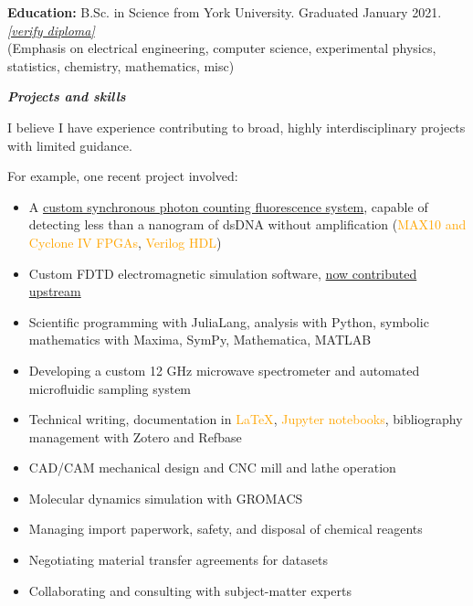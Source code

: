 \documentclass[fleqn,11pt]{article}
\newcommand{\ressection}[1]{\textbf{{\Large \textit{#1}}}\xrfill[0.1ex]{0.6pt}}
\newcommand{\sk}[1]{\textcolor{orange}{#1}}
\newcommand{\itemoptions}{\setlength{\itemindent}{-10pt} \setlength\itemsep{-1em}}
\begin{document}
\begin{tcolorbox}
	\textbf{Education:} B.Sc. in Science from York University. Graduated January 2021. \href{https://learner.mycreds.ca/#/sharelink/b664abe7-53a7-4d64-a0f1-bef16337edd0/57724eeb-34ab-4b79-b2a6-cd6bc311039e}{\textit{[verify diploma]}} \\
	{\small(Emphasis on electrical engineering, computer science, experimental physics, statistics, chemistry, mathematics, misc)}
\end{tcolorbox}
 
\pagebreak

\ressection{Projects and skills}

I believe I have experience contributing to broad, highly interdisciplinary projects with limited guidance.

For example, one recent project involved:
\begin{itemize}\itemoptions
	\item A \href{https://github.com/0xDBFB7/fluorescence_photon_counting/releases/download/v0.01/fluorescence.pdf}{custom synchronous photon counting fluorescence system}, capable of detecting less than a nanogram of dsDNA without amplification (\sk{MAX10 and Cyclone IV FPGAs}, \sk{Verilog HDL})
	\item Custom FDTD electromagnetic simulation software, \href{https://github.com/flaport/fdtd/pull/27}{now contributed upstream} 
	\item Scientific programming with JuliaLang, analysis with Python, symbolic mathematics with Maxima, SymPy, Mathematica, MATLAB
	\item Developing a custom 12 GHz microwave spectrometer and automated microfluidic sampling system
	\item Technical writing, documentation in \sk{LaTeX}, \sk{Jupyter notebooks}, bibliography management with Zotero and Refbase
	\item CAD/CAM mechanical design and CNC mill and lathe operation
	\item Molecular dynamics simulation with GROMACS
	\item Managing import paperwork, safety, and disposal of chemical reagents
	\item Negotiating material transfer agreements for datasets
	\item Collaborating and consulting with subject-matter experts
\end{itemize}
\end{document}
